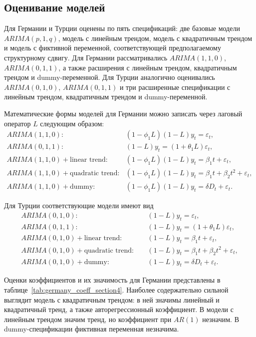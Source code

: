 \documentclass[12pt,a4paper]{article}
\begin{document}
\subsection{Оценивание моделей}

Для Германии и Турции оценены по пять спецификаций: две базовые модели $ARIMA(p,1,q)$, модель с линейным трендом, модель с квадратичным трендом и модель с фиктивной переменной, соответствующей предполагаемому структурному сдвигу. Для Германии рассматривались $ARIMA(1,1,0)$, $ARIMA(0,1,1)$, а также расширения с линейным трендом, квадратичным трендом и dummy-переменной. Для Турции аналогично оценивались $ARIMA(0,1,0)$, $ARIMA(0,1,1)$ и три расширенные спецификации с линейным трендом, квадратичным трендом и dummy-переменной.

Математические формы моделей для Германии можно записать через лаговый оператор $L$ следующим образом:
\[
\begin{aligned}
ARIMA(1,1,0): \quad &(1-\phi_1L)(1-L)y_t=\varepsilon_t,\\
ARIMA(0,1,1): \quad &(1-L)y_t=(1+\theta_1L)\varepsilon_t,\\
ARIMA(1,1,0)+\text{linear trend}: \quad &(1-\phi_1L)(1-L)y_t=\beta_1 t+\varepsilon_t,\\
ARIMA(1,1,0)+\text{quadratic trend}: \quad &(1-\phi_1L)(1-L)y_t=\beta_1 t+\beta_2 t^2+\varepsilon_t,\\
ARIMA(1,1,0)+\text{dummy}: \quad &(1-\phi_1L)(1-L)y_t=\delta D_t+\varepsilon_t.
\end{aligned}
\]

Для Турции соответствующие модели имеют вид
\[
\begin{aligned}
ARIMA(0,1,0): \quad &(1-L)y_t=\varepsilon_t,\\
ARIMA(0,1,1): \quad &(1-L)y_t=(1+\theta_1L)\varepsilon_t,\\
ARIMA(0,1,0)+\text{linear trend}: \quad &(1-L)y_t=\beta_1 t+\varepsilon_t,\\
ARIMA(0,1,0)+\text{quadratic trend}: \quad &(1-L)y_t=\beta_1 t+\beta_2 t^2+\varepsilon_t,\\
ARIMA(0,1,0)+\text{dummy}: \quad &(1-L)y_t=\delta D_t+\varepsilon_t.
\end{aligned}
\]

Оценки коэффициентов и их значимость для Германии представлены в таблице~\ref{tab:germany_coeff_section4}. Наиболее содержательно сильной выглядит модель с квадратичным трендом: в ней значимы линейный и квадратичный тренд, а также авторегрессионный коэффициент. В модели с линейным трендом значим тренд, но коэффициент при $AR(1)$ незначим. В dummy-спецификации фиктивная переменная незначима.
\end{document}

